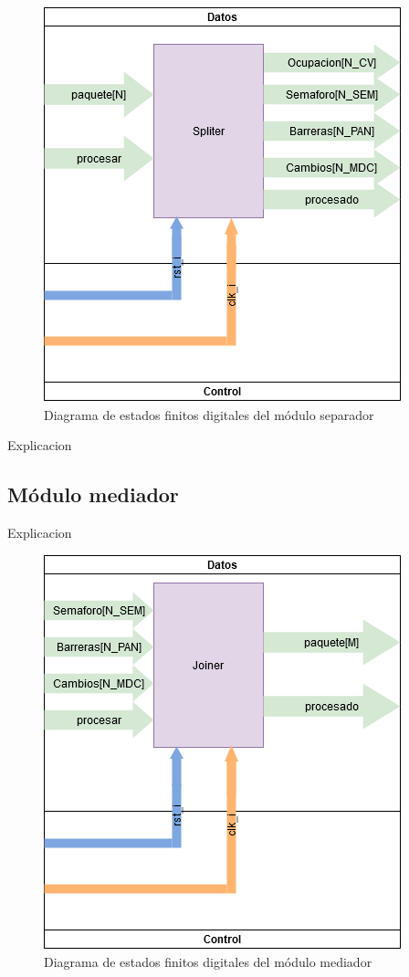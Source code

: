 		\begin{figure}[h]
		\centering
			\includegraphics[scale=.3]{./Figures/FSMD-Separador}
			\caption{Diagrama de estados finitos digitales del módulo separador}
			\label{fig:FSMD_Separador}
		\end{figure}
		
		Explicacion 
		
	\subsection{Módulo mediador}
	
		Explicacion 
		
		\begin{figure}[h]
		\centering
			\includegraphics[scale=.3]{./Figures/FSMD-Mediador}
			\caption{Diagrama de estados finitos digitales del módulo mediador}
			\label{fig:FSMD_Mediador}
		\end{figure}
		
